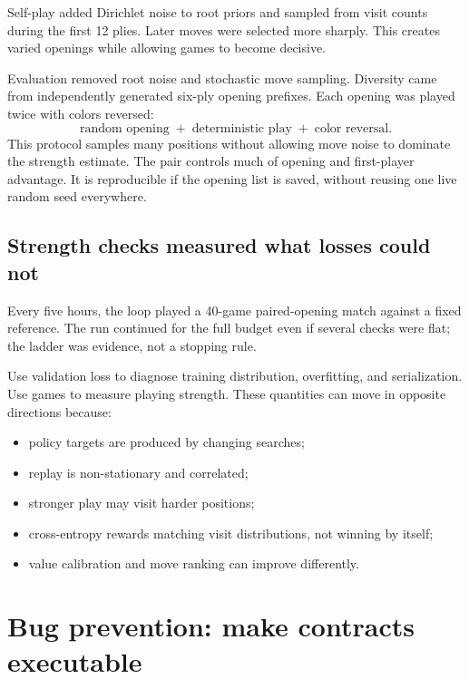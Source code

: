 \documentclass[10.5pt,letterpaper]{article}
\begin{document}
Self-play added Dirichlet noise to root priors and sampled from visit counts
during the first 12 plies. Later moves were selected more sharply. This creates
varied openings while allowing games to become decisive.

Evaluation removed root noise and stochastic move sampling. Diversity came
from independently generated six-ply opening prefixes. Each opening was played
twice with colors reversed:
\[
  \text{random opening}
  \;+\;
  \text{deterministic play}
  \;+\;
  \text{color reversal}.
\]
This protocol samples many positions without allowing move noise to dominate
the strength estimate. The pair controls much of opening and first-player
advantage. It is reproducible if the opening list is saved, without reusing one
live random seed everywhere.

\subsection{Strength checks measured what losses could not}

Every five hours, the loop played a 40-game paired-opening match against a
fixed reference. The run continued for the full budget even if several checks
were flat; the ladder was evidence, not a stopping rule.

Use validation loss to diagnose training distribution, overfitting, and
serialization. Use games to measure playing strength. These quantities can
move in opposite directions because:
\begin{itemize}
  \item policy targets are produced by changing searches;
  \item replay is non-stationary and correlated;
  \item stronger play may visit harder positions;
  \item cross-entropy rewards matching visit distributions, not winning by
        itself;
  \item value calibration and move ranking can improve differently.
\end{itemize}

\section{Bug prevention: make contracts executable}
\end{document}
